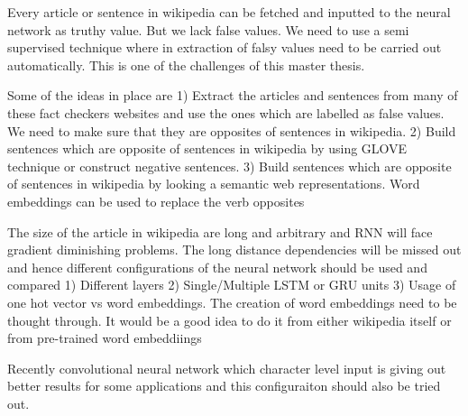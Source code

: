 \documentclass[a4paper, 11pt]{article}
\begin{document}
Every article or sentence in wikipedia can be fetched and inputted to the neural network as truthy value. But we lack false values. We need to use a semi supervised technique where in extraction of falsy values need to be carried out automatically. This is one of the challenges of this master thesis. 

Some of the ideas in place are
1) Extract the articles and sentences from many of these fact checkers websites and use the ones which are labelled as false values. We need to make sure that they are opposites of sentences in wikipedia.
2) Build sentences which are opposite of sentences in wikipedia by using GLOVE technique or construct negative sentences. 
3) Build sentences which are opposite of sentences in wikipedia by looking a semantic web representations. Word embeddings can be used to replace the verb opposites 

The size of the article in wikipedia are long and arbitrary and RNN will face gradient diminishing problems. The long distance dependencies will be missed out and hence different configurations of the neural network should be used and compared 
1) Different layers
2) Single/Multiple LSTM or GRU units
3) Usage of one hot vector vs word embeddings. The creation of word embeddings need to be thought through. It would be a good idea to do it from either wikipedia itself or from pre-trained word embeddiings


Recently convolutional neural network which character level input is giving out better results for some applications and this configuraiton should also be tried out.




\end{document}
